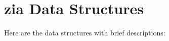 \section{zia Data Structures}
Here are the data structures with brief descriptions:\begin{CompactList}
\item{}
\end{CompactList}
